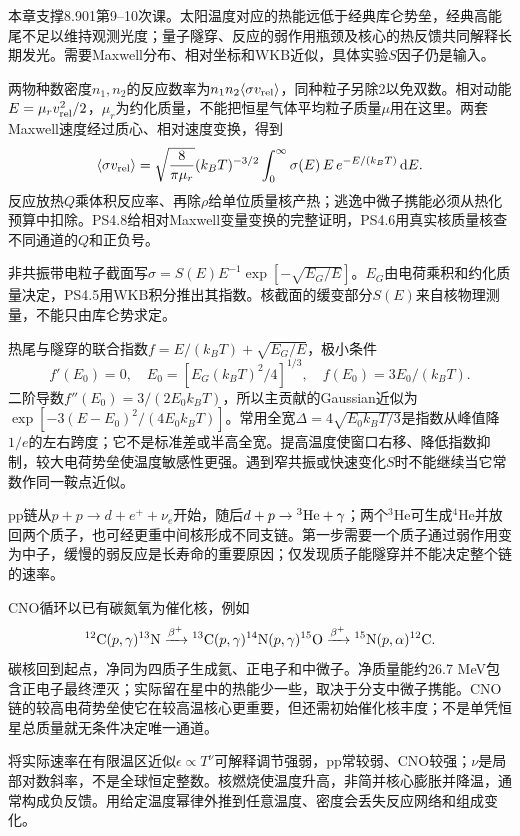 本章支撑8.901第9--10次课。太阳温度对应的热能远低于经典库仑势垒，经典高能尾不足以维持观测光度；量子隧穿、反应的弱作用瓶颈及核心的热反馈共同解释长期发光。需要Maxwell分布、相对坐标和WKB近似，具体实验$S$因子仍是输入。

两物种数密度$n_1,n_2$的反应数率为$n_1n_2\langle\sigma v_{\rm rel}\rangle$，同种粒子另除2以免双数。相对动能$E=\mu_r v_{\rm rel}^2/2$，$\mu_r$为约化质量，不能把恒星气体平均粒子质量$\mu$用在这里。两套Maxwell速度经过质心、相对速度变换，得到
\[
 \langle\sigma v_{\rm rel}\rangle
 =\sqrt{\frac8{\pi\mu_r}}(k_BT)^{-3/2}
 \int_0^\infty \sigma(E)\,E\,e^{-E/(k_BT)}\,\mathrm d E .
\]
反应放热$Q$乘体积反应率、再除$\rho$给单位质量核产热；逃逸中微子携能必须从热化预算中扣除。PS4.8给相对Maxwell变量变换的完整证明，PS4.6用真实核质量核查不同通道的$Q$和正负号。

非共振带电粒子截面写$\sigma=S(E)E^{-1}\exp[-\sqrt{E_G/E}]$。$E_G$由电荷乘积和约化质量决定，PS4.5用WKB积分推出其指数。核截面的缓变部分$S(E)$来自核物理测量，不能只由库仑势求定。

热尾与隧穿的联合指数$f=E/(k_BT)+\sqrt{E_G/E}$，极小条件
\[
 f'(E_0)=0,\quad E_0=[E_G(k_BT)^2/4]^{1/3},\quad
 f(E_0)=3E_0/(k_BT).
\]
二阶导数$f''(E_0)=3/(2E_0k_BT)$，所以主贡献的Gaussian近似为$\exp[-3(E-E_0)^2/(4E_0k_BT)]$。常用全宽$\Delta=4\sqrt{E_0k_BT/3}$是指数从峰值降$1/e$的左右跨度；它不是标准差或半高全宽。提高温度使窗口右移、降低指数抑制，较大电荷势垒使温度敏感性更强。遇到窄共振或快速变化$S$时不能继续当它常数作同一鞍点近似。

pp链从$p+p\to d+e^++\nu_e$开始，随后$d+p\to{}^3{\rm He}+\gamma$；两个$^3$He可生成$^4$He并放回两个质子，也可经更重中间核形成不同支链。第一步需要一个质子通过弱作用变为中子，缓慢的弱反应是长寿命的重要原因；仅发现质子能隧穿并不能决定整个链的速率。

CNO循环以已有碳氮氧为催化核，例如
\[
 {}^{12}{\rm C}(p,\gamma){}^{13}{\rm N}
 \xrightarrow{\beta^+}{}^{13}{\rm C}(p,\gamma){}^{14}{\rm N}
 (p,\gamma){}^{15}{\rm O}
 \xrightarrow{\beta^+}{}^{15}{\rm N}(p,\alpha){}^{12}{\rm C}.
\]
碳核回到起点，净同为四质子生成氦、正电子和中微子。净质量能约26.7 MeV包含正电子最终湮灭；实际留在星中的热能少一些，取决于分支中微子携能。CNO链的较高电荷势垒使它在较高温核心更重要，但还需初始催化核丰度；不是单凭恒星总质量就无条件决定唯一通道。

将实际速率在有限温区近似$\epsilon\propto T^\nu$可解释调节强弱，pp常较弱、CNO较强；$\nu$是局部对数斜率，不是全球恒定整数。核燃烧使温度升高，非简并核心膨胀并降温，通常构成负反馈。用给定温度幂律外推到任意温度、密度会丢失反应网络和组成变化。

